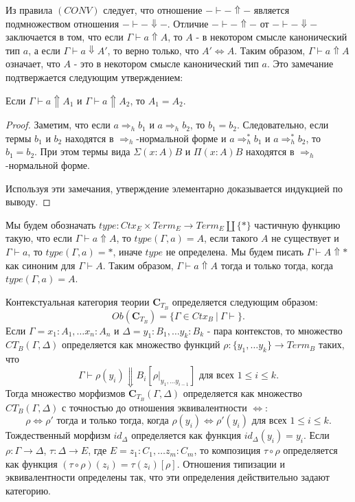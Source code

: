 \documentclass{amsart}
\theoremstyle{definition}
\theoremstyle{remark}
\newcommand{\red}{\Rightarrow}
\newcommand{\deq}{\Leftrightarrow}
\newcommand{\cat}[1]{\mathbf{#1}}
\renewcommand{\C}{\cat{C}}
\numberwithin{figure}{section}
\begin{document}
Из правила $(CONV)$ следует, что отношение $- \vdash - \Uparrow -$ является подмножеством отношения $- \vdash - \Downarrow -$.
Отличие $- \vdash - \Uparrow -$ от $- \vdash - \Downarrow -$ заключается в том, что если $\Gamma \vdash a \Uparrow A$, то $A$ - в некотором смысле канонический тип $a$, а если $\Gamma \vdash a \Downarrow A'$, то верно только, что $A' \deq A$.
Таким образом, $\Gamma \vdash a \Uparrow A$ означает, что $A$ - это в некотором смысле канонический тип $a$.
Это замечание подтвержается следующим утверждением:

\begin{prop}
Если $\Gamma \vdash a \Uparrow A_1$ и $\Gamma \vdash a \Uparrow A_2$, то $A_1 = A_2$.
\end{prop}
\begin{proof}
Заметим, что если $a \red_h b_1$ и $a \red_h b_2$, то $b_1 = b_2$.
Следовательно, если термы $b_1$ и $b_2$ находятся в $\red_h$-нормальной форме и $a \red^*_h b_1$ и $a \red^*_h b_2$, то $b_1 = b_2$.
При этом термы вида $\Sigma (x : A) B$ и $\Pi (x : A) B$ находятся в $\red_h$-нормальной форме.

Используя эти замечания, утверждение элементарно доказывается индукцией по выводу.
\end{proof}

Мы будем обозначать $type : Ctx_E \times Term_E \to Term_E \amalg \{ * \}$ частичную функцию такую, что если $\Gamma \vdash a \Uparrow A$, то $type(\Gamma, a) = A$, если такого $A$ не существует и $\Gamma \vdash a$, то $type(\Gamma, a) = *$, иначе $type$ не определена.
Мы будем писать $\Gamma \vdash A \Uparrow *$ как синоним для $\Gamma \vdash A$.
Таким образом, $\Gamma \vdash a \Uparrow A$ тогда и только тогда, когда $type(\Gamma, a) = A$.

Контекстуальная категория теории $\C_{T_B}$ определяется следующим образом:
\[ Ob(\C_{T_B}) = \{ \Gamma \in Ctx_B\ |\ \Gamma \vdash \}. \]
Если $\Gamma = x_1 : A_1, \ldots x_n : A_n$ и $\Delta = y_1 : B_1, \ldots y_k : B_k$ - пара контекстов,
то множество $CT_B(\Gamma, \Delta)$ определяется как множество функций $\rho : \{ y_1, \ldots y_k\} \to Term_B$ таких, что
\[ \Gamma \vdash \rho(y_i) \Downarrow B_i[\rho |_{y_1, \ldots y_{i-1}}] \text{ для всех } 1 \leq i \leq k. \]
Тогда множество морфизмов $\C_{T_B}(\Gamma, \Delta)$ определяется как множество $CT_B(\Gamma, \Delta)$ с точностью до отношения эквивалентности $\deq$:
\[ \rho \deq \rho' \text{ тогда и только тогда, когда } \rho(y_i) \deq \rho'(y_i) \text{ для всех } 1 \leq i \leq k. \]
Тождественный морфизм $id_\Delta$ определяется как функция $id_\Delta(y_i) = y_i$.
Если $\rho : \Gamma \to \Delta$, $\tau : \Delta \to E$, где $E = z_1 : C_1, \ldots z_m : C_m$, то композиция $\tau \circ \rho$ определяется как функция $(\tau \circ \rho)(z_i) = \tau(z_i)[\rho]$.
Отношения типизации и эквивалентности определены так, что эти определения действительно задают категорию.
\end{document}
